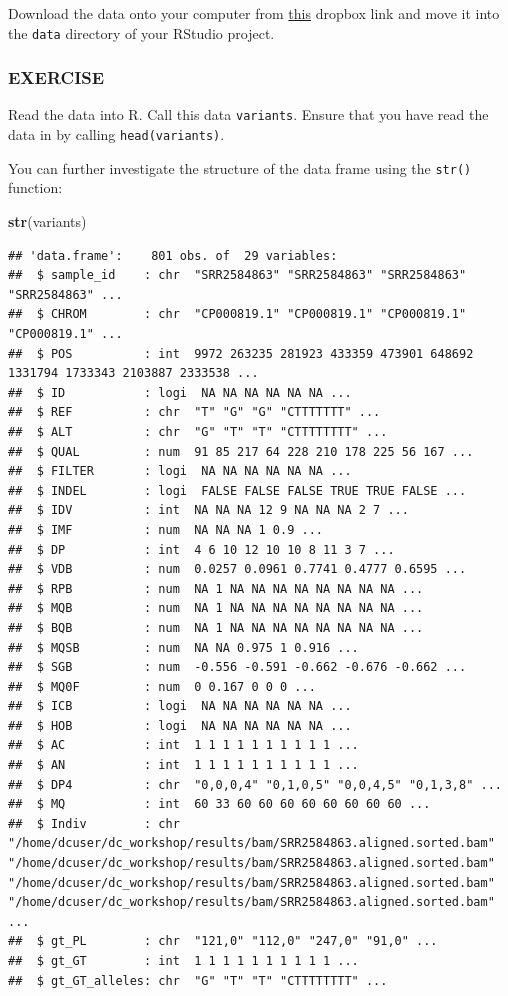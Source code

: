 \documentclass[
]{book}
\newenvironment{Shaded}{\begin{snugshade}}{\end{snugshade}}
\newcommand{\FunctionTok}[1]{\textcolor[rgb]{0.13,0.29,0.53}{\textbf{#1}}}
\newcommand{\NormalTok}[1]{#1}
\begin{document}
Download the data onto your computer from \href{https://www.dropbox.com/sh/pegir6j09mq7sia/AACQO9BnNAEl4EofAhmyqjmXa?dl=0}{this} dropbox link and move it into the \texttt{data} directory of your RStudio project.

\subsubsection*{EXERCISE}\label{exercise}

Read the data into R. Call this data \texttt{variants}. Ensure that you have read the data in by calling \texttt{head(variants)}.

You can further investigate the structure of the data frame using the \texttt{str()} function:

\begin{Shaded}
\begin{Highlighting}[]
\FunctionTok{str}\NormalTok{(variants)}
\end{Highlighting}
\end{Shaded}

\begin{verbatim}
## 'data.frame':    801 obs. of  29 variables:
##  $ sample_id    : chr  "SRR2584863" "SRR2584863" "SRR2584863" "SRR2584863" ...
##  $ CHROM        : chr  "CP000819.1" "CP000819.1" "CP000819.1" "CP000819.1" ...
##  $ POS          : int  9972 263235 281923 433359 473901 648692 1331794 1733343 2103887 2333538 ...
##  $ ID           : logi  NA NA NA NA NA NA ...
##  $ REF          : chr  "T" "G" "G" "CTTTTTTT" ...
##  $ ALT          : chr  "G" "T" "T" "CTTTTTTTT" ...
##  $ QUAL         : num  91 85 217 64 228 210 178 225 56 167 ...
##  $ FILTER       : logi  NA NA NA NA NA NA ...
##  $ INDEL        : logi  FALSE FALSE FALSE TRUE TRUE FALSE ...
##  $ IDV          : int  NA NA NA 12 9 NA NA NA 2 7 ...
##  $ IMF          : num  NA NA NA 1 0.9 ...
##  $ DP           : int  4 6 10 12 10 10 8 11 3 7 ...
##  $ VDB          : num  0.0257 0.0961 0.7741 0.4777 0.6595 ...
##  $ RPB          : num  NA 1 NA NA NA NA NA NA NA NA ...
##  $ MQB          : num  NA 1 NA NA NA NA NA NA NA NA ...
##  $ BQB          : num  NA 1 NA NA NA NA NA NA NA NA ...
##  $ MQSB         : num  NA NA 0.975 1 0.916 ...
##  $ SGB          : num  -0.556 -0.591 -0.662 -0.676 -0.662 ...
##  $ MQ0F         : num  0 0.167 0 0 0 ...
##  $ ICB          : logi  NA NA NA NA NA NA ...
##  $ HOB          : logi  NA NA NA NA NA NA ...
##  $ AC           : int  1 1 1 1 1 1 1 1 1 1 ...
##  $ AN           : int  1 1 1 1 1 1 1 1 1 1 ...
##  $ DP4          : chr  "0,0,0,4" "0,1,0,5" "0,0,4,5" "0,1,3,8" ...
##  $ MQ           : int  60 33 60 60 60 60 60 60 60 60 ...
##  $ Indiv        : chr  "/home/dcuser/dc_workshop/results/bam/SRR2584863.aligned.sorted.bam" "/home/dcuser/dc_workshop/results/bam/SRR2584863.aligned.sorted.bam" "/home/dcuser/dc_workshop/results/bam/SRR2584863.aligned.sorted.bam" "/home/dcuser/dc_workshop/results/bam/SRR2584863.aligned.sorted.bam" ...
##  $ gt_PL        : chr  "121,0" "112,0" "247,0" "91,0" ...
##  $ gt_GT        : int  1 1 1 1 1 1 1 1 1 1 ...
##  $ gt_GT_alleles: chr  "G" "T" "T" "CTTTTTTTT" ...
\end{verbatim}
\end{document}
